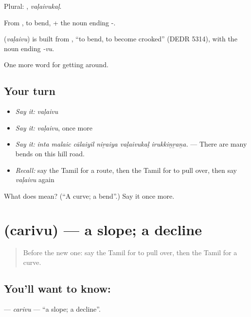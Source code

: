 Plural: , \emph{vaḷaivukaḷ}.

From , to bend, + the noun ending -.

\begin{cousinweb}
\textbf{} (\emph{vaḷaivu}) is built from , \textquotedblleft{}to bend, to become crooked\textquotedblright{} (DEDR 5314), with the noun ending \emph{-vu}.
\end{cousinweb}

\begin{grammarlens}[title={What you've built}]
One more word for getting around.
\end{grammarlens}

\subsection*{Your turn}
\begin{itemize}
\raggedright
  \item \emph{Say it:} \emph{vaḷaivu}
  \item \emph{Say it:} \emph{vaḷaivu}, once more
  \item \emph{Say it:} \emph{inta malaic cālaiyil niṟaiya vaḷaivukaḷ irukkiṉṟaṉa.} — There are many bends on this hill road.
  \item \emph{Recall:} say the Tamil for a route, then the Tamil for to pull over, then say \emph{vaḷaivu} again
\end{itemize}

\begin{tcolorbox}[breakable,colback=teal!4,colframe=teal!35!black,title={Before you move on}]
What does  mean? (\textquotedblleft{}A curve; a bend\textquotedblright{}.) Say it once more.
\end{tcolorbox}
\section[\texorpdfstring{\ta{சரிவு} (carivu)}{சரிவு (carivu)}]{ (carivu) — a slope; a decline}

\label{lesson:TA-C408-carivu}



\begin{quote}
Before the new one: say the Tamil for to pull over, then the Tamil for a curve.
\end{quote}

\subsection*{You'll want to know: }
\textbf{} — \emph{carivu} — \textquotedblleft{}a slope; a decline\textquotedblright{}.

